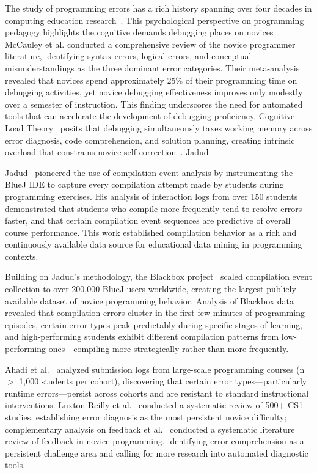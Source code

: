 \documentclass[acmsmall]{acmart}
\begin{document}
The study of programming errors has a rich history spanning over four decades
in computing education research~\cite{winslow1996programming}. This psychological perspective on
programming pedagogy highlights the cognitive demands debugging places on novices~\cite{winslow1996programming}.
McCauley et al.\cite{mccauley2008evidence} conducted a comprehensive review of the novice programmer literature, identifying
syntax errors, logical errors, and conceptual misunderstandings as the three
dominant error categories. Their meta-analysis revealed that novices spend
approximately 25\% of their programming time on debugging activities, yet
novice debugging effectiveness improves only modestly over a semester of
instruction. This finding underscores the need for automated tools that can
accelerate the development of debugging proficiency. Cognitive Load Theory~\cite{sweller2011cognitive} posits that debugging simultaneously
taxes working memory across error diagnosis, code comprehension, and solution planning,
creating intrinsic overload that constrains novice self-correction~\cite{kirschner2018cognitive}. Jadud

Jadud~\cite{jadud2006methods} pioneered the use of compilation event analysis
by instrumenting the BlueJ IDE to capture every compilation attempt made by
students during programming exercises. His analysis of interaction logs from
over 150 students demonstrated that students who compile more frequently tend
to resolve errors faster, and that certain compilation event sequences are
predictive of overall course performance. This work established compilation
behavior as a rich and continuously available data source for educational data
mining in programming contexts.

Building on Jadud's methodology, the Blackbox
project~\cite{brown2014blackbox}
scaled compilation event collection to over 200,000 BlueJ users worldwide,
creating the largest publicly available dataset of novice programming behavior.
Analysis of Blackbox data revealed that compilation errors cluster in the
first few minutes of programming episodes, certain error types peak
predictably during specific stages of learning, and high-performing students
exhibit different compilation patterns from low-performing ones---compiling
more strategically rather than more frequently.

Ahadi et al.~\cite{ahadi2015exploring} analyzed submission logs from
large-scale programming courses (n $>$ 1,000 students per cohort), discovering
that certain error types---particularly runtime errors---persist across cohorts
and are resistant to standard instructional interventions. Luxton-Reilly et al.~\cite{luxton2018introductory} conducted a systematic review of 500+ CS1 studies,
establishing error diagnosis as the most persistent novice difficulty; complementary
analysis on feedback\cite{barbosa2023feedback}
et al.~\cite{barbosa2023feedback} conducted a systematic literature review
of feedback in novice programming, identifying error comprehension as a
persistent challenge area and calling for more
research into automated diagnostic tools.
\end{document}
